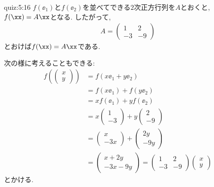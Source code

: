 \begin{answerof}{quiz:5:16}
  $f(\ee_1)$と$f(\ee_2)$を並べてできる$2$次正方行列を$A$とおくと,
  $f(\xx)=A\xx$となる.
  したがって,
  \begin{align*}
    A=\begin{pmatrix}1&2\\-3&-9\end{pmatrix}
  \end{align*}
  とおけば$f(\xx)=A\xx$である.

  次の様に考えることもできる:
  \begin{align*}
    f(\begin{pmatrix}x\\y\end{pmatrix})
      &=f(x\ee_1+y\ee_2)\\
      &=f(x\ee_1)+f(y\ee_2)\\
      &=xf(\ee_1)+yf(\ee_2)\\
      &=x\begin{pmatrix}1\\-3\end{pmatrix}+y\begin{pmatrix}2\\-9\end{pmatrix}\\
      &=\begin{pmatrix}x\\-3x\end{pmatrix}+\begin{pmatrix}2y\\-9y\end{pmatrix}\\
      &=\begin{pmatrix}x+2y\\-3x-9y\end{pmatrix}
      =\begin{pmatrix}1&2\\-3&-9\end{pmatrix}\begin{pmatrix}x\\y\end{pmatrix}
  \end{align*}
  とかける.
\end{answerof}


